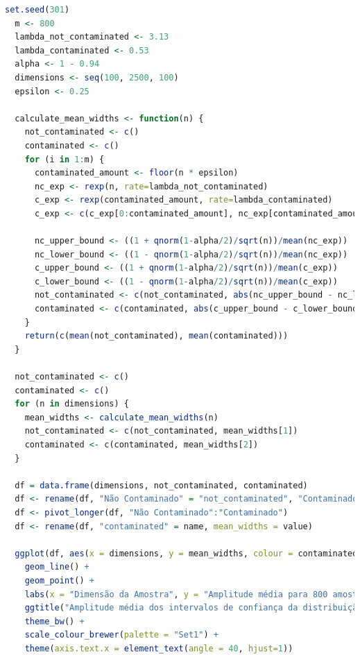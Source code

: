 \documentclass[10pt]{article}
\begin{document}
\begin{lstlisting}[language=R]
  set.seed(301)
  m <- 800
  lambda_not_contaminated <- 3.13
  lambda_contaminated <- 0.53
  alpha <- 1 - 0.94
  dimensions <- seq(100, 2500, 100)
  epsilon <- 0.25

  calculate_mean_widths <- function(n) {
    not_contaminated <- c()
    contaminated <- c()
    for (i in 1:m) {
      contaminated_amount <- floor(n * epsilon)
      nc_exp <- rexp(n, rate=lambda_not_contaminated)
      c_exp <- rexp(contaminated_amount, rate=lambda_contaminated)
      c_exp <- c(c_exp[0:contaminated_amount], nc_exp[contaminated_amount:n])

      nc_upper_bound <- ((1 + qnorm(1-alpha/2)/sqrt(n))/mean(nc_exp))
      nc_lower_bound <- ((1 - qnorm(1-alpha/2)/sqrt(n))/mean(nc_exp))
      c_upper_bound <- ((1 + qnorm(1-alpha/2)/sqrt(n))/mean(c_exp))
      c_lower_bound <- ((1 - qnorm(1-alpha/2)/sqrt(n))/mean(c_exp))
      not_contaminated <- c(not_contaminated, abs(nc_upper_bound - nc_lower_bound))
      contaminated <- c(contaminated, abs(c_upper_bound - c_lower_bound))
    }
    return(c(mean(not_contaminated), mean(contaminated)))
  }

  not_contaminated <- c()
  contaminated <- c()
  for (n in dimensions) {
    mean_widths <- calculate_mean_widths(n)
    not_contaminated <- c(not_contaminated, mean_widths[1])
    contaminated <- c(contaminated, mean_widths[2])
  }

  df = data.frame(dimensions, not_contaminated, contaminated)
  df <- rename(df, "Não Contaminado" = "not_contaminated", "Contaminado" = "contaminated")
  df <- pivot_longer(df, "Não Contaminado":"Contaminado")
  df <- rename(df, "contaminated" = name, mean_widths = value)

  ggplot(df, aes(x = dimensions, y = mean_widths, colour = contaminated)) +
    geom_line() +
    geom_point() +
    labs(x = "Dimensão da Amostra", y = "Amplitude média para 800 amostras") +
    ggtitle("Amplitude média dos intervalos de confiança da distribuição exponencial") +
    theme_bw() +
    scale_colour_brewer(palette = "Set1") +
    theme(axis.text.x = element_text(angle = 40, hjust=1))
\end{lstlisting}
\end{document}
